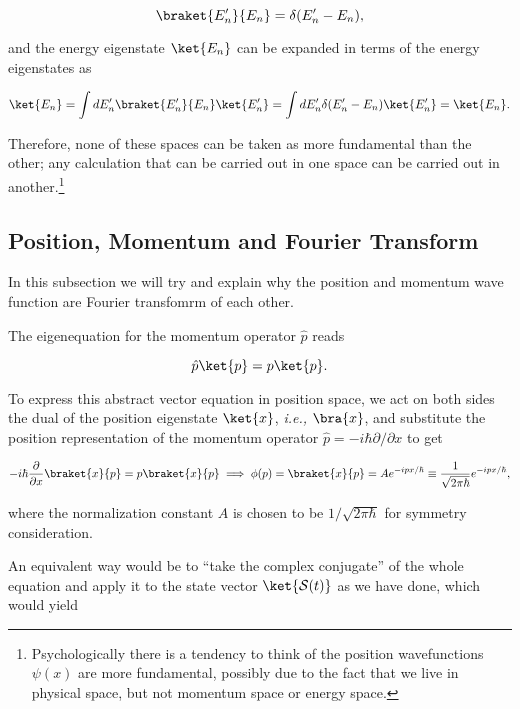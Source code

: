 \documentclass[a4paper,12pt]{report}
\begin{document}
\begin{equation}
  \braket{E_{n} '}{E_{n} } = \delta (E_{n}' - E_{n}  ),
\end{equation}

and the energy eigenstate \(\ket{E_{n} } \) can be expanded in terms of the energy eigenstates as 

\begin{equation}
  \ket{E_{n} } = \int dE_{n} ' \braket{E_{n} '}{E_{n} } \ket{E_{n} '} = \int dE_{n} ' \delta (E_{n} '-E_{n} ) \ket{E_{n} '} = \ket{E_{n} }.  
\end{equation}

Therefore, none of these spaces can be taken as more fundamental than the other; any calculation that can be carried out in one space can be carried out in another.\footnote{Psychologically there is a tendency to think of the position wavefunctions \(\psi (x)\) are more fundamental, possibly due to the fact that we live in physical space, but not momentum space or energy space.} 

\subsection{Position, Momentum and Fourier Transform}

In this subsection we will try and explain why the position and momentum wave function are Fourier transfomrm of each other.

The eigenequation for the momentum operator \(\hat{p} \) reads

\begin{equation}
  \hat{p}  \ket{p} = p \ket{p}.  
\end{equation}

To express this abstract vector equation in position space, we act on both sides the dual of the position eigenstate \(\ket{x} \), \textit{i.e.,} \(\bra{x} \), and substitute the position representation of the momentum operator \(\hat{p} = -i \hbar \partial /\partial x\) to get 

\begin{equation}
  -i \hbar \frac{\partial }{\partial x} \braket{x}{p} = p \braket{x}{p} \implies \phi (p) = \braket{x}{p} = Ae^{-ipx /\hbar } \equiv \frac{1}{\sqrt{2\pi \hbar } } e^{-ipx /\hbar },   
\end{equation}

where the normalization constant \(A\) is chosen to be \(1/\sqrt{2\pi \hbar }  \) for symmetry consideration.  

An equivalent way would be to ``take the complex conjugate'' of the whole equation and apply it to the state vector \(\ket{\mathcal{S}(t)} \) as we have done, which would yield  
\end{document}

